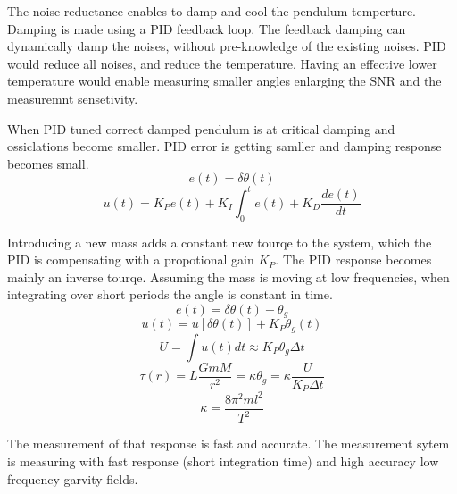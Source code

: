 \documentclass[\main/master.tex]{subfiles}
\begin{document}
The noise reductance enables to damp and cool the pendulum temperture. Damping is made using a PID feedback loop. The feedback damping can dynamically damp the noises, without pre-knowledge of the existing noises. PID would reduce all noises, and reduce the temperature. Having an effective lower temperature would enable measuring smaller angles enlarging the SNR and the measuremnt sensetivity.
\par
When PID tuned correct damped pendulum is at critical damping and ossiclations become smaller. PID error is getting samller and damping response becomes small. 
\begin{equation}
e(t) = \delta\theta(t)   \label{eqn:pid_error}
\end{equation}
\begin{equation}
u(t) = K_Pe(t)+K_I\int_{0}^{t}e(t)+K_D\frac{de(t)}{dt}   \label{eqn:PID_eq}
\end{equation}

Introducing a new mass adds a constant new tourqe to the system, which the PID is compensating with a propotional gain $K_P$. The PID response becomes mainly an inverse tourqe. Assuming the mass is moving at low frequencies, when integrating over short periods the angle is constant in time.
\begin{equation}
e(t) = \delta\theta(t) + \theta_g    \label{eqn:PID_measurement}
\end{equation}
\begin{equation}
u(t) = u[ \delta\theta(t)] + K_P\theta_g(t) \label{eqn:PID_measurement_eq}
\end{equation}
\begin{equation}
U = \int u(t)dt  \approx K_P\theta_g\Delta t \label{eqn:PID_measurement_eq}
\end{equation}
\begin{equation}
\tau(r) = L\frac{GmM}{r^2} =  \kappa\theta_g = \kappa\frac{U}{K_P\Delta t}      \label{eqn:pid_gravitation_tourqe}
\end{equation}
\begin{equation}
\kappa =\frac{8\pi^2ml^2}{T^2}    \label{eqn:empirical_tourqe}
\end{equation}

The measurement of that response is fast and accurate. The measurement sytem is measuring with fast response (short integration time) and high accuracy low frequency garvity fields. 

 
 
 
 
\end{document}
